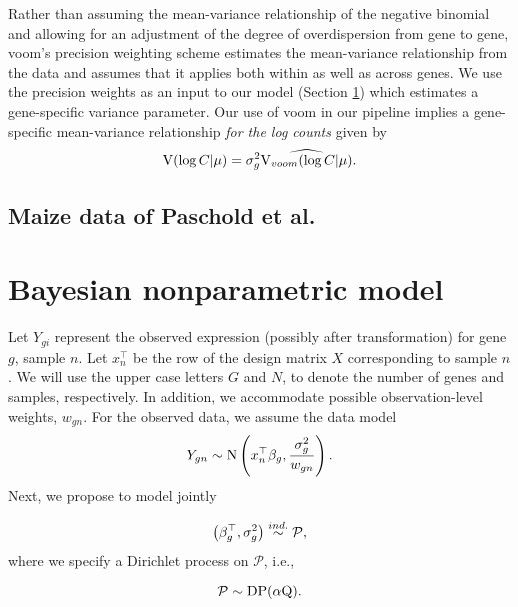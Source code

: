 Rather than assuming the mean-variance relationship of the negative binomial and allowing for an adjustment of the degree of overdispersion from gene to gene, voom's precision weighting scheme estimates the mean-variance relationship from the data and assumes that it applies both within as well as across genes. We use the precision weights as an input to our model (Section \ref{sec:model}) which estimates a gene-specific variance parameter. Our use of voom in our pipeline implies a gene-specific mean-variance relationship \textit{for the log counts} given by
$$\operatorname{V}(\log C|\mu)=\sigma^2_g \widehat{\operatorname{V}_{voom}(\log C|\mu)}.$$


\subsection{Maize data of Paschold et al.}


\section{Bayesian nonparametric model}
\label{sec:model}
Let $Y_{gi}$ represent the observed expression (possibly after transformation) for gene $g$, sample $n$. Let $x_{n}^\top$ be the row of the design matrix $X$ corresponding to sample $n$. We will use the upper case letters $G$ and $N$, to denote the number of genes and samples, respectively. In addition, we accommodate possible observation-level weights, $w_{gn}$. For the observed data, we assume the data model
\begin{equation}
Y_{gn} \sim \operatorname{N} \left( x_{n}^\top \beta_g, \frac{\sigma^2_g}{w_{gn}} \right).
\end{equation}
Next, we propose to model jointly

\begin{equation}
\left(\beta_g^\top,\sigma^2_g\right) \stackrel{ind.}{\sim} \mathcal{P},
\end{equation}
where we specify a Dirichlet process on $\mathcal{P}$, i.e.,

\begin{equation}
\mathcal{P} \sim \operatorname{DP}(\alpha \mbox{Q}).
\end{equation}

